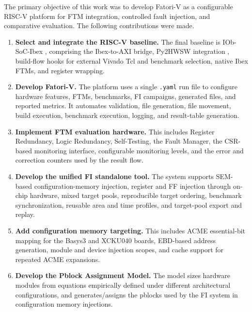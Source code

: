 The primary objective of this work was to develop \ac{Fatori-V} as a configurable \ac{RISC-V} platform for \ac{FTM} integration, controlled fault injection, and comparative evaluation. The following contributions were made.

\begin{enumerate}
    \item \textbf{Select and integrate the \ac{RISC-V} baseline.} The final baseline is IOb-SoC-Ibex \cite{iob-soc-ibex}, comprising the Ibex-to-\ac{AXI} bridge, Py2HWSW integration \cite{py2hwsw}, build-flow hooks for external Vivado Tcl and benchmark selection, native Ibex \acp{FTM}, and register wrapping.

    \item \textbf{Develop \ac{Fatori-V}.} The platform uses a single \texttt{.yaml} run file to configure hardware features, \acp{FTM}, benchmarks, \ac{FI} campaigns, generated files, and reported metrics. It automates validation, file generation, file movement, build execution, benchmark execution, logging, and result-table generation.

    \item \textbf{Implement \ac{FTM} evaluation hardware.} This includes Register Redundancy, Logic Redundancy, Self-Testing, the Fault Manager, the \ac{CSR}-based monitoring interface, configurable monitoring levels, and the error and correction counters used by the result flow.

    \item \textbf{Develop the unified \ac{FI} standalone tool.} The system supports \ac{SEM}-based \cite{SEM} configuration-memory injection, register and \ac{FF} injection through on-chip hardware, mixed target pools, reproducible target ordering, benchmark synchronization, reusable area and time profiles, and target-pool export and replay.

    \item \textbf{Add configuration memory targeting.} This includes \ac{ACME} \cite{ACME} essential-bit mapping for the Basys3 and XCKU040 boards, \ac{EBD}-based address generation, module and device injection scopes, and cache support for repeated \ac{ACME} expansions.

    \item \textbf{Develop the Pblock Assignment Model.} The model sizes hardware modules from equations empirically defined under different architectural configurations, and generates/assigns the pblocks used by the \ac{FI} system in configuration memory injections.


\end{enumerate}
